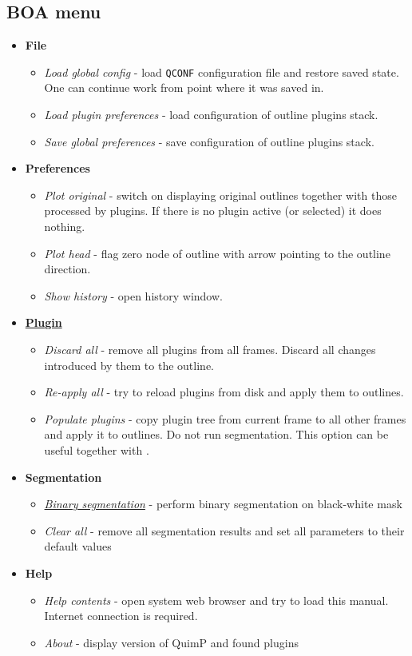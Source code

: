 \documentclass[a4paper,12pt]{article}
\begin{document}
\subsection{BOA menu}
\label{sec:boaMenu}
\begin{itemize}
	\item \textbf{File}
	\begin{itemize}
		\item \textit{Load global config} - load \texttt{QCONF} configuration file and restore saved state. One can continue work from point where it was saved in.
		\item \textit{Load plugin preferences} - load configuration of outline plugins stack.  
		\item \textit{Save global preferences} - save configuration of outline plugins stack.
	\end{itemize}
	\item \textbf{Preferences}
	\begin{itemize}
		\item \textit{Plot original} - switch on displaying original outlines together with those processed by plugins. If there is no plugin active (or selected) it does nothing.
		\item \textit{Plot head} - flag zero node of outline with arrow pointing to the outline direction.
		\item \textit{Show history} - open history window.
	\end{itemize}
	\item \hyperref[sec:boaFilters]{\textbf{Plugin}}
	\begin{itemize}
		\item \textit{Discard all} - remove all plugins from all frames. Discard all changes introduced by them to the outline.
		\item \textit{Re-apply all} - try to reload plugins from disk and apply them to outlines.
		\item \textit{Populate plugins} - copy plugin tree from current frame to all other frames and apply it to  outlines. Do not run segmentation. This option can be useful together with .
	\end{itemize}
	\item \textbf{Segmentation}
	\begin{itemize}
		\item \hyperref[sec:Binary_seg]{\textit{Binary segmentation}} - perform binary segmentation on black-white mask 
		\item \textit{Clear all} - remove all segmentation results and set all parameters to their default values
	\end{itemize}
	\item \textbf{Help}
	\begin{itemize}
		\item \textit{Help contents} - open system web browser and try to load this manual. Internet connection is required. 
		\item \textit{About} - display version of QuimP and found plugins
	\end{itemize}
\end{itemize}
\end{document}
